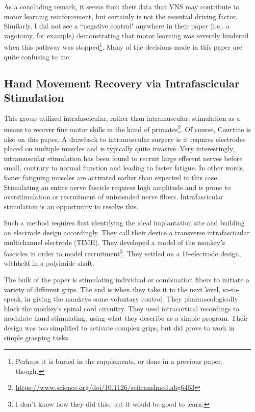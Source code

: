 As a concluding remark, it seems from their data that VNS may contribute to motor learning reinforcement, but certainly is not the essential driving factor. Similarly, I did not see a ``negative control" anywhere in their paper (i.e., a vagotomy, for example) demonstrating that motor learning was severely hindered when this pathway was stopped\footnote{Perhaps it is buried in the supplements, or done in a previous paper, though.}. Many of the decisions made in this paper are quite confusing to me. 

\subsection{Hand Movement Recovery via Intrafascicular Stimulation}

This group utilized intrafascicular, rather than intramuscular, stimulation as a means to recover fine motor skills in the hand of primates\footnote{\url{https://www.science.org/doi/10.1126/scitranslmed.abg6463}}. Of course, Courtine is also on this paper. A drawback to intramuscular surgery is it requires electrodes placed on multiple muscles and is typically quite invasive. Very interestingly, intramuscular stimulation has been found to recruit large efferent nerves before small, contrary to normal function and leading to faster fatigue. In other words, faster fatiguing muscles are activated earlier than expected in this case. Stimulating an entire nerve fascicle requires high amplitude and is prone to overstimulation or recruitment of unintended nerve fibers. Intrafascicular stimulation is an opportunity to resolve this.\newline

Such a method requires first identifying the ideal implantation site and building an electrode design accordingly. They call their device a transverse intrafascicular multichannel electrode (TIME). They developed a model of the monkey's fascicles in order to model recruitment\footnote{I don't know how they did this, but it would be good to learn.}. They settled on a 16-electrode design, withheld in a polyimide shaft.\newline

The bulk of the paper is stimulating individual or combination fibers to initiate a variety of different grips. The end is when they take it to the next level, so-to-speak, in giving the monkeys some voluntary control. They pharmacologically block the monkey's spinal cord circuitry. They used intracortical recordings to modulate hand stimulating, using what they describe as a simple program. Their design was too simplified to activate complex grips, but did prove to work in simple grasping tasks. 





